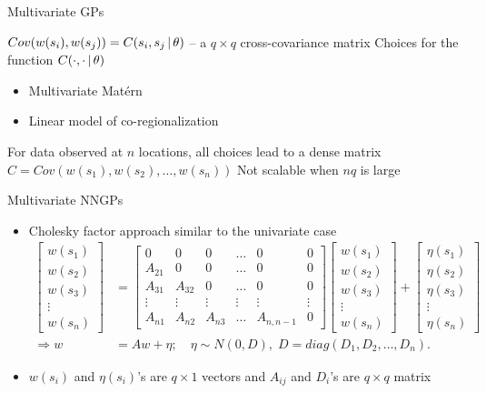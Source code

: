 \begin{frame}{Multivariate GPs}
\begin{itemize}
\myitem $Cov(w(s_i),w(s_j)) = C(s_i,s_j \,|\, \theta)$ -- a $q \times q$ \alert{cross-covariance} matrix
\myitem Choices for the function $C(\cdot, \cdot \,|\, \theta)$
	\begin{itemize}
	\item Multivariate Mat\'ern
	\item Linear model of co-regionalization
	\end{itemize}
\myitem For data observed at $n$ locations, all choices lead to a dense  matrix $C = Cov(w(s_1),w(s_2),\ldots,w(s_n))$
\myitem Not scalable when $nq$ is large
\end{itemize}
\end{frame}

\begin{frame}{Multivariate NNGPs}
\begin{itemize}
\item Cholesky factor approach similar to the univariate case
\begin{align*}
		\begin{bmatrix} w(s_1) \\ w(s_2) \\ w(s_3) \\ \vdots \\ w(s_n) \end{bmatrix} &= \begin{bmatrix} 0 & 0 & 0 & \ldots & 0 & 0 \\ A_{21} & 0 & 0 & \ldots & 0 & 0\\ 
A_{31} & A_{32} & 0 & \ldots & 0 & 0 \\ \vdots & \vdots & \vdots & \vdots & \vdots & \vdots \\ A_{n1} & A_{n2} & A_{n3} & \ldots & A_{n,n-1} & 0\end{bmatrix}\begin{bmatrix} w(s_1) \\ w(s_2) \\ w(s_3) \\ \vdots \\ w(s_n) \end{bmatrix} + \begin{bmatrix} \eta(s_1) \\ \eta(s_2) \\ \eta(s_3) \\ \vdots \\ \eta(s_n) \end{bmatrix} \\
		\Longrightarrow w &= Aw + \eta;\quad \eta \sim N(0, D),\;  D=diag(D_1,D_2,\ldots,D_n).
		\end{align*}
\item {} $w(s_i)$ and $\eta(s_i)$'s are $q \times 1$ vectors and $A_{ij}$ and $D_i$'s are $q \times q$ matrix
\end{itemize}
\end{frame}

